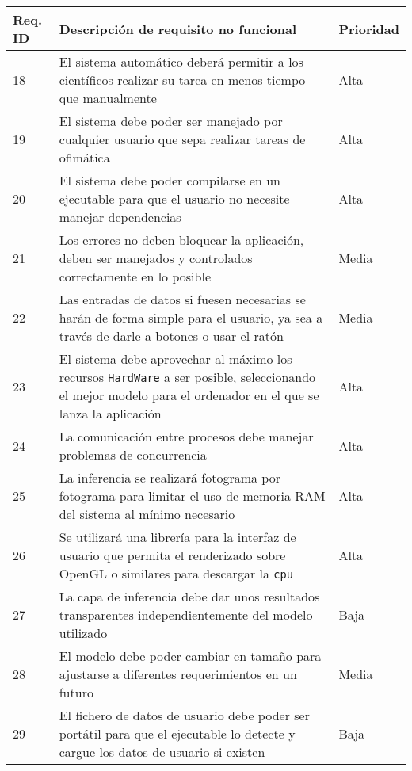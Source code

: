 \begin{table}[H]
    \begin{center}
        \begin{tabular}{p{} | p{} p{}}
            Req. ID & Descripción de requisito no funcional & Prioridad\\
            \hline
            18& El sistema automático deberá permitir a los científicos realizar su tarea en menos tiempo que manualmente & Alta\\
            \hline
            19& El sistema debe poder ser manejado por cualquier usuario que sepa realizar tareas de ofimática & Alta\\
            \hline
            20& El sistema debe poder compilarse en un ejecutable para que el usuario no necesite manejar dependencias  & Alta\\
            \hline
            21& Los errores no deben bloquear la aplicación, deben ser manejados y controlados correctamente en lo posible & Media\\
            \hline
            22& Las entradas de datos si fuesen necesarias se harán de forma simple para el usuario, ya sea a través de darle a botones o usar el ratón & Media\\
            \hline
            23& El sistema debe aprovechar al máximo los recursos \texttt{HardWare} a ser posible, seleccionando el mejor modelo para el ordenador en el que se lanza la aplicación & Alta\\
            \hline
            24& La comunicación entre procesos debe manejar problemas de concurrencia & Alta\\
            \hline
            25& La inferencia se realizará fotograma por fotograma para limitar el uso de memoria RAM del sistema al mínimo necesario & Alta\\
            \hline
            26& Se utilizará una librería para la interfaz de usuario que permita el renderizado sobre OpenGL o similares para descargar la \texttt{\acrshort{cpu}} & Alta\\
            \hline
            27& La capa de inferencia debe dar unos resultados transparentes independientemente del modelo utilizado & Baja\\
            \hline
            28& El modelo debe poder cambiar en tamaño para ajustarse a diferentes requerimientos en un futuro & Media\\
            \hline
            29& El fichero de datos de usuario debe poder ser portátil para que el ejecutable lo detecte y cargue los datos de usuario si existen & Baja\\

\end{tabular}
\end{center}
\end{table}

